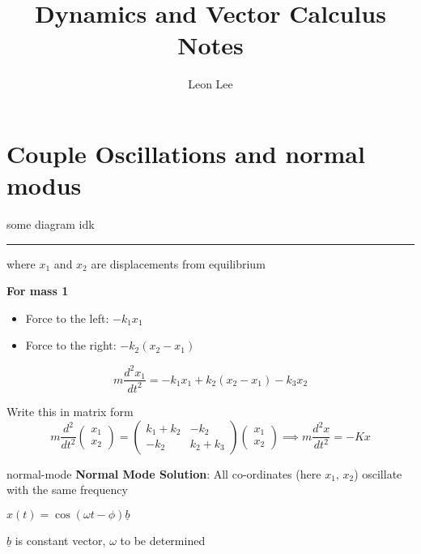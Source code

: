 \documentclass{article}
\title{Dynamics and Vector Calculus Notes}
\author{Leon Lee}
\begin{document}
\maketitle
\newpage
\tableofcontents
\newpage

\section{Couple Oscillations and normal modus}

some diagram idk

\noindent\rule{\textwidth}{0.2pt}

where $x_{1}$ and $x_{2}$ are displacements from equilibrium

\textbf{For mass 1}
\begin{itemize}
    \item Force to the left: $-k_{1}x_{1}$
    \item Force to the right: $-k_{2}(x_{2}-x_{1})$
\end{itemize}

\[m \frac{d^{2}x_{1}}{dt^{2}} = -k_{1}x_{1} + k_{2}(x_{2} - x_{1}) - k_{3}x_{2}\]

Write this in matrix form
\[m \frac{d^{2}}{dt^{2}}\begin{pmatrix}
    x_{1} \\
    x_{2}
\end{pmatrix} = \begin{pmatrix}
k_{1} + k_{2} & -k_{2} \\
-k_{2} & k_{2} + k_{3}
\end{pmatrix} \begin{pmatrix}
    x_{1} \\
    x_{2}
\end{pmatrix} \implies m \frac{d^{2}x}{dt^{2}} = -K x\]

\begin{dfn}{normal-mode}{}
    \textbf{Normal Mode Solution}: All co-ordinates (here $x_{1},\,x_{2}$) oscillate with the same frequency
\end{dfn}

$x(t) = \cos{(\omega t - \phi)} \underline{b}$

$\underline{b}$ is constant vector, $\omega$ to be determined
\end{document}
